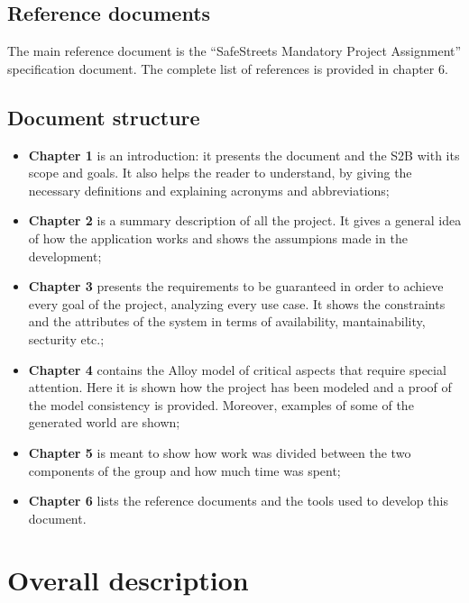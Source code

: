 \documentclass[12pt,a4paper]{report}
\begin{document}
	\section{Reference documents}
	The main reference document is the ``SafeStreets Mandatory Project Assignment'' specification document. The complete list of references is provided in chapter 6.

	\section{Document structure}
	\begin{itemize}
	\item \textbf{Chapter 1} is an introduction: it presents the document and the S2B with its scope and goals. It also helps the reader to understand, by giving the necessary definitions and explaining acronyms and abbreviations; 
	\item \textbf{Chapter 2} is a summary description of all the project. It gives a general idea of how the application works and shows the assumpions made in the development;
	\item \textbf{Chapter 3} presents the requirements to be guaranteed in order to achieve every goal of the project, analyzing every use case. It shows the constraints and the attributes of the system in terms of availability, mantainability, secturity etc.;
	\item \textbf{Chapter 4} contains the Alloy model of critical aspects that require special attention. Here it is shown how the project has been modeled and a proof of the model consistency is provided. Moreover, examples of some of the generated world are shown;
	\item \textbf{Chapter 5} is meant to show how work was divided between the two components of the group and how much time was spent;
	\item \textbf{Chapter 6} lists the reference documents and the tools used to develop this document.
	\end{itemize}


\chapter{Overall description}
\end{document}
